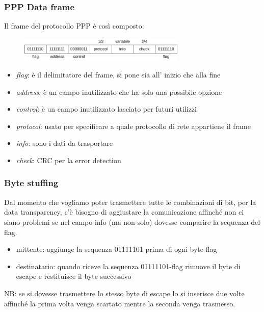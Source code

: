 \subsubsection{PPP Data frame}
Il frame del protocollo PPP è così composto:
\begin{figure}[H]
    \centering
    \includegraphics[width=300px]{images/3_Reti_connessione_diretta/ppp_data_frame.png}
\end{figure}
\begin{itemize}
    \item \emph{flag}: è il delimitatore del frame, si pone sia all' inizio che alla fine
    \item \emph{address}: è un campo inutilizzato che ha solo una possibile opzione
    \item \emph{control}: è un campo inutilizzato lasciato per futuri utilizzi
    \item \emph{protocol}: usato per specificare a quale protocollo di rete appartiene il frame
    \item \emph{info}: sono i dati da trasportare
    \item \emph{check}: CRC per la error detection
\end{itemize}

\subsubsection{Byte stuffing}
Dal momento che vogliamo poter trasmettere tutte le combinazioni di bit, per la data transparency, c'è bisogno di aggiustare la comunicazione affinché non ci siano problemi se nel campo info (ma non solo) dovesse comparire la sequenza del flag.
\begin{itemize}
    \item mittente: aggiunge la sequenza 01111101 prima di ogni byte flag
    
    \item destinatario: quando riceve la sequenza 01111101-flag rimuove il byte di escape e restituisce il byte successivo
\end{itemize}
NB: se si dovesse trasmettere lo stesso byte di escape lo si inserisce due volte affinché la prima volta venga scartato mentre la seconda venga trasmesso.

